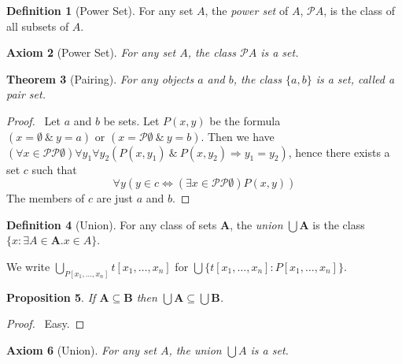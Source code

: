 \documentclass{article}
\let\qed\relax
\newtheorem{axiom}{Axiom}
\newtheorem{proposition}[axiom]{Proposition}
\newtheorem{theorem}[axiom]{Theorem}
\theoremstyle{definition}
\newtheorem{definition}[axiom]{Definition}
\begin{document}
    \begin{definition}[Power Set]
        For any set $A$, the \emph{power set} of $A$, $\mathcal{P} A$, is the class of all subsets of $A$.
    \end{definition}

    \begin{axiom}[Power Set]
        For any set $A$, the class $\mathcal{P} A$ is a set.
    \end{axiom}

    \begin{theorem}[Pairing]
        For any objects $a$ and $b$, the class $\{a,b\}$ is a set, called a \emph{pair set}.
    \end{theorem}

    \begin{proof}
        \pf\      Let $a$ and $b$ be sets. Let $P(x,y)$ be the formula $(x = \emptyset \ \&\ y = a) \text{ or }
        (x = \mathcal{P} \emptyset \ \&\ y = b)$. Then we have $(\forall x \in \mathcal{P} \mathcal{P}
        \emptyset) \forall y_1 \forall y_2 (P(x,y_1) \ \&\ P(x,y_2) \Rightarrow y_1 = y_2)$,
        hence there exists a set $c$ such that
        \[ \forall y (y \in c \Leftrightarrow (\exists x \in \mathcal{P} \mathcal{P} \emptyset) P(x,y)) \]
        The members of $c$ are just $a$ and $b$. \qed   
    \end{proof}

    \begin{definition}[Union]
        For any class of sets $\mathbf{A}$, the \emph{union} $\bigcup \mathbf{A}$ is the class
        $\{ x : \exists A \in \mathbf{A}. x \in A \}$.

        We write $\bigcup_{P[x_1, \ldots, x_n]} t[x_1, \ldots, x_n]$ for $\bigcup \{ t[x_1, \ldots, x_n]
        : P[x_1, \ldots, x_n] \}$.
    \end{definition}

    \begin{proposition}
        If $\mathbf{A} \subseteq \mathbf{B}$ then $\bigcup \mathbf{A} \subseteq \bigcup \mathbf{B}$.
    \end{proposition}

    \begin{proof}
        \pf\ Easy. \qed
    \end{proof}

    \begin{axiom}[Union]
        For any set $A$, the union $\bigcup A$ is a set.
    \end{axiom}
\end{document}
